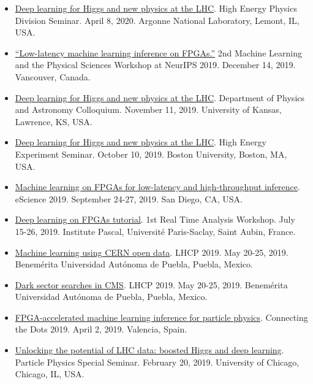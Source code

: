 \documentclass[11pt]{res}
\begin{document}
\begin{resume}
\begin{itemize}
    \item \href{https://indico.fnal.gov/event/22961/}{Deep learning for Higgs and new physics at the LHC}. High Energy Physics Division Seminar. April 8, 2020. Argonne National Laboratory, Lemont, IL, USA.
    \item \href{https://ml4physicalsciences.github.io/2019/files/NeurIPS_ML4PS_2019_74.pdf}{``Low-latency machine learning inference on FPGAs.''} 2nd Machine Learning and the Physical Sciences Workshop at NeurIPS 2019.  December 14, 2019. Vancouver, Canada.
    \item \href{https://physics.drupal.ku.edu/calendar/colloquia#/?i=2}{Deep learning for Higgs and new physics at the LHC}. Department of Physics and Astronomy Colloquium. November 11, 2019. University of Kansas, Lawrence, KS, USA.
    \item \href{http://physics.bu.edu/events/show/2204}{Deep learning for Higgs and new physics at the LHC}. High Energy Experiment Seminar. October 10, 2019. Boston University, Boston, MA, USA.
    \item \href{https://escience2019.sdsc.edu/program}{Machine learning on FPGAs for low-latency and high-throughput inference}. eScience 2019. September 24-27, 2019. San Diego, CA, USA.
    \item \href{https://indico.cern.ch/event/793125/contributions/3495251/}{Deep learning on FPGAs tutorial}. 1st Real Time Analysis Workshop. July 15-26, 2019. Institute Pascal, Universit\'{e} Paris-Saclay, Saint Aubin, France.
    \item \href{https://indico.cern.ch/event/687651/contributions/3428206/}{Machine learning using CERN open data}. LHCP 2019. May 20-25, 2019. Benem\'{e}rita Universidad Aut\'{o}noma de Puebla, Puebla, Mexico.
    \item \href{https://indico.cern.ch/event/687651/contributions/3426898/}{Dark sector searches in CMS}. LHCP 2019. May 20-25, 2019. Benem\'{e}rita Universidad Aut\'{o}noma de Puebla, Puebla, Mexico.
    \item \href{https://indico.cern.ch/event/742793/contributions/3274392/}{FPGA-accelerated machine learning inference for particle physics}. Connecting the Dots 2019. April 2, 2019. Valencia, Spain.
    \item \href{https://universityofchicago.hosted.panopto.com/Panopto/Pages/Viewer.aspx?id=66ca09d7-74c1-4b12-bb57-a9fa01046cdf}{Unlocking the potential of LHC data: boosted Higgs and deep learning}. Particle Physics Special Seminar. February 20, 2019. University of Chicago, Chicago, IL, USA.

\end{itemize}
\end{resume}
\end{document}
